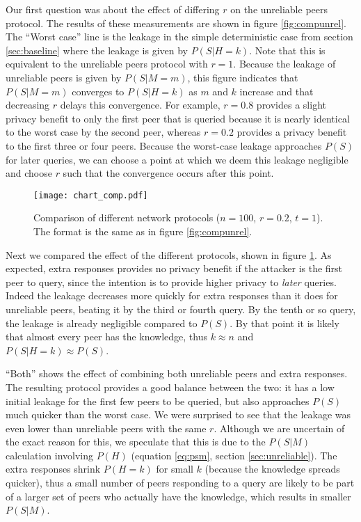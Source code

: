 \documentclass{article}
\newcommand{\eqnref}[1]{equation \eqref{eq:#1}}
\newcommand{\secref}[1]{section \ref{sec:#1}}
\newcommand{\figref}[1]{figure \ref{fig:#1}}
\begin{document}
Our first question was about the effect of differing $r$ on the unreliable peers
protocol. The results of these measurements are shown in \figref{compunrel}.
The ``Worst case'' line is the leakage in the simple deterministic case from
\secref{baseline} where the leakage is given by $P(S|H=k)$. Note that
this is equivalent to the unreliable peers protocol with $r=1$. Because the
leakage of unreliable peers is given by $P(S|M=m)$, this figure
indicates that $P(S|M=m)$ converges to $P(S|H=k)$ as $m$ and $k$ increase and
that decreasing $r$ delays this convergence. For example, $r=0.8$ provides a
slight privacy benefit to only the first peer that is queried because it is nearly identical
to the worst case by the second peer, whereas $r=0.2$ provides a privacy benefit to the first
three or four peers. Because the worst-case leakage approaches $P(S)$ for later
queries, we can
choose a point at which we deem this leakage negligible and choose $r$ such that
the convergence occurs after this point.


\begin{figure}%
    \centering
	\texttt{[image: chart\_comp.pdf]}
	\caption{Comparison of different network protocols ($n=100$, $r=0.2$, $t=1$).
	The format is the same as in \figref{compunrel}.}
    \label{fig:comp}%
\end{figure}

Next we compared the effect of the different protocols, shown in \figref{comp}.
As expected, extra responses provides no privacy benefit if the attacker is the
first peer to query, since the intention is to provide higher privacy to {\it
later} queries. Indeed the leakage decreases more quickly for extra
responses than it does for unreliable peers, beating it by the third or fourth
query. By the tenth or so query, the leakage is already negligible compared to
$P(S)$. By that point it is likely that almost every peer has the knowledge,
thus $k\approx n$ and $P(S|H=k)\approx P(S)$.

``Both'' shows the effect of combining both unreliable peers and extra
responses. The resulting protocol provides a good balance between the two: it
has a low initial leakage for the first few peers to be queried, but also
approaches $P(S)$ much quicker than the worst case. We were surprised to see
that the leakage was even lower than unreliable peers with the same $r$.
Although we are uncertain of the exact reason for this, we speculate that this
is due to the $P(S|M)$ calculation involving $P(H)$ (\eqnref{psm},
\secref{unreliable}). The extra responses
shrink $P(H=k)$ for small $k$ (because the knowledge spreads quicker), thus a
small number of peers responding to a query are likely to be part of a larger
set of peers who actually have the knowledge, which results in smaller $P(S|M)$.
\end{document}
